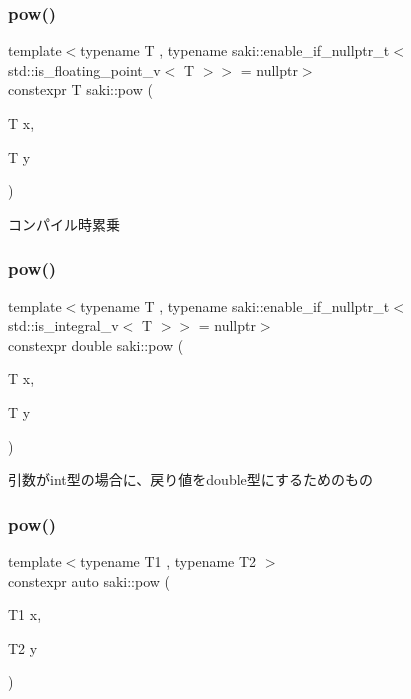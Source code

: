 \mbox{\label{namespacesaki_aa5b66f18d7c8c94b4c50731449ed3240}} 
\subsubsection{\texorpdfstring{pow()}{pow()}\hspace{0.1cm}{\footnotesize\ttfamily [1/3]}}
{\footnotesize\ttfamily template$<$typename T , typename saki\+::enable\+\_\+if\+\_\+nullptr\+\_\+t$<$ std\+::is\+\_\+floating\+\_\+point\+\_\+v$<$ T $>$$>$  = nullptr$>$ \\
constexpr T saki\+::pow (\begin{DoxyParamCaption}\item[{T}]{x,  }\item[{T}]{y }\end{DoxyParamCaption})}



コンパイル時累乗 

\mbox{\label{namespacesaki_a53b0e93733e85d7c6ab17aea25072536}} 
\subsubsection{\texorpdfstring{pow()}{pow()}\hspace{0.1cm}{\footnotesize\ttfamily [2/3]}}
{\footnotesize\ttfamily template$<$typename T , typename saki\+::enable\+\_\+if\+\_\+nullptr\+\_\+t$<$ std\+::is\+\_\+integral\+\_\+v$<$ T $>$$>$  = nullptr$>$ \\
constexpr double saki\+::pow (\begin{DoxyParamCaption}\item[{T}]{x,  }\item[{T}]{y }\end{DoxyParamCaption})}



引数がint型の場合に、戻り値をdouble型にするためのもの 

\mbox{\label{namespacesaki_aede1168d9c20adf475c0a27670925c34}} 
\subsubsection{\texorpdfstring{pow()}{pow()}\hspace{0.1cm}{\footnotesize\ttfamily [3/3]}}
{\footnotesize\ttfamily template$<$typename T1 , typename T2 $>$ \\
constexpr auto saki\+::pow (\begin{DoxyParamCaption}\item[{T1}]{x,  }\item[{T2}]{y }\end{DoxyParamCaption})}




